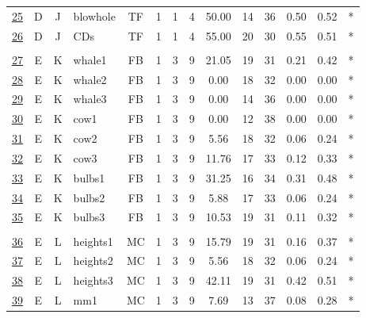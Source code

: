 \documentclass[12pt,english,nohyper]{tufte-handout}\usepackage[]{graphicx}\usepackage[]{color}
\begin{document}
\begin{longtable}{cccl|cccc|ccccc|l}
  \hyperlink{T06.D.J.04.1.1.TF.blowhole.2}{25} & D & J & blowhole & TF &   1 &   1 &   4 & 50.00 &  14 &  36 & 0.50 & 0.52 & * \\ 
  \hyperlink{T06.D.J.04.1.1.TF.CDs.2}{26} & D & J & CDs & TF &   1 &   1 &   4 & 55.00 &  20 &  30 & 0.55 & 0.51 & * \\ 
   &  &  &  &  &  &  &  &  &  &  &  &  &  \\ 
  \hyperlink{T06.E.K.09.3.1.FB.whale1.2}{27} & E & K & whale1 & FB &   1 &   3 &   9 & 21.05 &  19 &  31 & 0.21 & 0.42 & * \\ 
  \hyperlink{T06.E.K.09.3.1.FB.whale2.2}{28} & E & K & whale2 & FB &   1 &   3 &   9 & 0.00 &  18 &  32 & 0.00 & 0.00 & * \\ 
  \hyperlink{T06.E.K.09.3.1.FB.whale3.2}{29} & E & K & whale3 & FB &   1 &   3 &   9 & 0.00 &  14 &  36 & 0.00 & 0.00 & * \\ 
  \hyperlink{T06.E.K.09.3.1.FB.cow1.2}{30} & E & K & cow1 & FB &   1 &   3 &   9 & 0.00 &  12 &  38 & 0.00 & 0.00 & * \\ 
  \hyperlink{T06.E.K.09.3.1.FB.cow2.2}{31} & E & K & cow2 & FB &   1 &   3 &   9 & 5.56 &  18 &  32 & 0.06 & 0.24 & * \\ 
  \hyperlink{T06.E.K.09.3.1.FB.cow3.2}{32} & E & K & cow3 & FB &   1 &   3 &   9 & 11.76 &  17 &  33 & 0.12 & 0.33 & * \\ 
  \hyperlink{T06.E.K.09.3.1.FB.bulbs1.2}{33} & E & K & bulbs1 & FB &   1 &   3 &   9 & 31.25 &  16 &  34 & 0.31 & 0.48 & * \\ 
  \hyperlink{T06.E.K.09.3.1.FB.bulbs2.2}{34} & E & K & bulbs2 & FB &   1 &   3 &   9 & 5.88 &  17 &  33 & 0.06 & 0.24 & * \\ 
  \hyperlink{T06.E.K.09.3.1.FB.bulbs3.2}{35} & E & K & bulbs3 & FB &   1 &   3 &   9 & 10.53 &  19 &  31 & 0.11 & 0.32 & * \\ 
   &  &  &  &  &  &  &  &  &  &  &  &  &  \\ 
  \hyperlink{T06.E.L.09.3.1.MC.heights1.2}{36} & E & L & heights1 & MC &   1 &   3 &   9 & 15.79 &  19 &  31 & 0.16 & 0.37 & * \\ 
  \hyperlink{T06.E.L.09.3.1.MC.heights2.2}{37} & E & L & heights2 & MC &   1 &   3 &   9 & 5.56 &  18 &  32 & 0.06 & 0.24 & * \\ 
  \hyperlink{T06.E.L.09.3.1.MC.heights3.2}{38} & E & L & heights3 & MC &   1 &   3 &   9 & 42.11 &  19 &  31 & 0.42 & 0.51 & * \\ 
  \hyperlink{T06.E.L.09.3.1.MC.mm1.2}{39} & E & L & mm1 & MC &   1 &   3 &   9 & 7.69 &  13 &  37 & 0.08 & 0.28 & * \\ 

\end{longtable}
\end{document}
